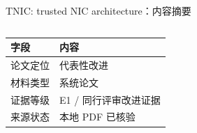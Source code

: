 \begin{frame}[t,shrink=6]{TNIC: trusted NIC architecture：内容摘要}
\begin{columns}[T,totalwidth=\textwidth]
\begin{column}{0.49\textwidth}
{\begin{minipage}[t]{0.97\linewidth}
\begin{minipage}{0.92\linewidth}
      \scriptsize {\tiny
\begin{tabularx}{\linewidth}{@{}YY@{}}
\toprule
\textbf{字段} & \textbf{内容} \\
\midrule
论文定位 & 代表性改进 \\
材料类型 & 系统论文 \\
证据等级 & E1 / 同行评审改进证据 \\
来源状态 & 本地 PDF 已核验 \\
\bottomrule
\end{tabularx}
}
    \end{minipage}
    \vspace{1mm}
  \end{minipage}}
  \end{column}
\end{columns}
\end{frame}



